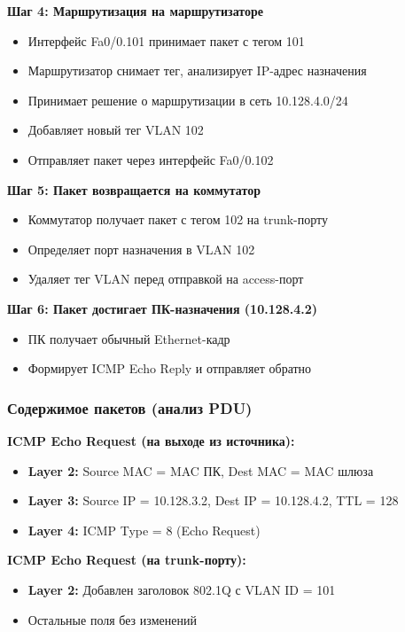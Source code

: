 \textbf{Шаг 4: Маршрутизация на маршрутизаторе}
\begin{itemize}
    \item Интерфейс Fa0/0.101 принимает пакет с тегом 101
    \item Маршрутизатор снимает тег, анализирует IP-адрес назначения
    \item Принимает решение о маршрутизации в сеть 10.128.4.0/24
    \item Добавляет новый тег VLAN 102
    \item Отправляет пакет через интерфейс Fa0/0.102
\end{itemize}

\textbf{Шаг 5: Пакет возвращается на коммутатор}
\begin{itemize}
    \item Коммутатор получает пакет с тегом 102 на trunk-порту
    \item Определяет порт назначения в VLAN 102
    \item Удаляет тег VLAN перед отправкой на access-порт
\end{itemize}

\textbf{Шаг 6: Пакет достигает ПК-назначения (10.128.4.2)}
\begin{itemize}
    \item ПК получает обычный Ethernet-кадр
    \item Формирует ICMP Echo Reply и отправляет обратно
\end{itemize}

\subsubsection{Содержимое пакетов (анализ PDU)}

\textbf{ICMP Echo Request (на выходе из источника):}
\begin{itemize}
    \item \textbf{Layer 2:} Source MAC = MAC ПК, Dest MAC = MAC шлюза
    \item \textbf{Layer 3:} Source IP = 10.128.3.2, Dest IP = 10.128.4.2, TTL = 128
    \item \textbf{Layer 4:} ICMP Type = 8 (Echo Request)
\end{itemize}

\textbf{ICMP Echo Request (на trunk-порту):}
\begin{itemize}
    \item \textbf{Layer 2:} Добавлен заголовок 802.1Q с VLAN ID = 101
    \item Остальные поля без изменений
\end{itemize}

